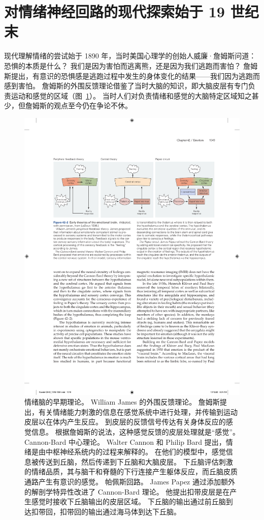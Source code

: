 \section{对情绪神经回路的现代探索始于 19 世纪末}
现代理解情绪的尝试始于 1890 年，当时美国心理学的创始人威廉·詹姆斯问道：恐惧的本质是什么？
我们是因为害怕而逃离熊，还是因为我们逃跑而害怕？
詹姆斯提出，有意识的恐惧感是逃跑过程中发生的身体变化的结果——我们因为逃跑而感到害怕。
詹姆斯的外围反馈理论借鉴了当时大脑的知识，即大脑皮层有专门负责运动和感觉的区域（图~\ref{fig:42_2}）。
当时人们对负责情绪和感觉的大脑特定区域知之甚少，但詹姆斯的观点至今仍在争论不休。


\begin{figure}[htbp]
	\centering
	\includegraphics[width=0.95\linewidth]{chap42/fig_42_2}
	\caption{情绪脑的早期理论\cite{ledoux1997emotional}。
		William James 的外围反馈理论。
		詹姆斯提出，有关情绪能力刺激的信息在感觉系统中进行处理，并传输到运动皮层以在体内产生反应。
		到皮层的反馈信号传达有关身体反应的感觉信息。
		根据詹姆斯的说法，这种感觉反馈的皮层处理就是“感觉”。 Cannon-Bard 中心理论。
		Walter Cannon 和 Philip Bard 提出，情绪是由中枢神经系统内的过程来解释的。
		在他们的模型中，感觉信息被传送到丘脑，然后传递到下丘脑和大脑皮层。
		下丘脑评估刺激的情绪品质，其与脑干和脊髓的下行连接产生躯体反应，而丘脑皮质通路产生有意识的感觉。
		帕佩斯回路。
		James Papez 通过添加额外的解剖学特异性改进了 Cannon-Bard 理论。
		他提出扣带皮层是在产生感觉时接收下丘脑输出的皮层区域。
		下丘脑的输出通过前丘脑到达扣带回，扣带回的输出通过海马体到达下丘脑。}
	\label{fig:42_2}
\end{figure}


